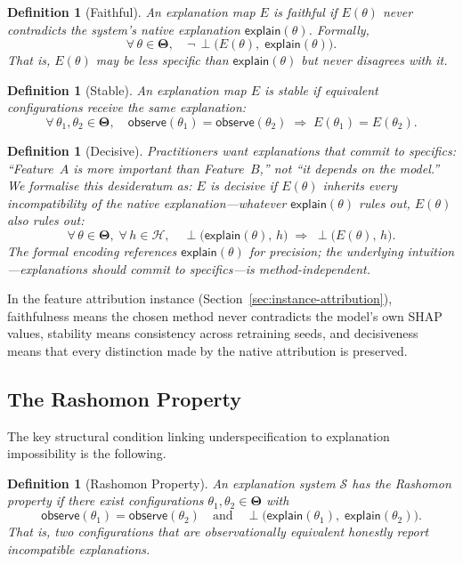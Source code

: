 \documentclass[11pt,a4paper]{article}
\newtheorem{definition}[theorem]{Definition}
\newcommand{\Params}{\mathbf{\Theta}}
\newcommand{\sH}{\mathcal{H}}
\newcommand{\incomp}{\perp}
\begin{document}
\begin{definition}[Faithful]
\label{def:faithful}
An explanation map $E$ is \emph{faithful} if $E(\theta)$ never contradicts the
system's native explanation $\mathsf{explain}(\theta)$.  Formally,
\[
  \forall\,\theta \in \Params,\quad
  \neg\,\incomp\bigl(E(\theta),\;\mathsf{explain}(\theta)\bigr).
\]
That is, $E(\theta)$ may be less specific than $\mathsf{explain}(\theta)$ but
never disagrees with it.
\end{definition}

\begin{definition}[Stable]
\label{def:stable}
An explanation map $E$ is \emph{stable} if equivalent configurations receive
the same explanation:
\[
  \forall\,\theta_1, \theta_2 \in \Params,\quad
  \mathsf{observe}(\theta_1) = \mathsf{observe}(\theta_2)
  \;\Longrightarrow\;
  E(\theta_1) = E(\theta_2).
\]
\end{definition}

\begin{definition}[Decisive]
\label{def:decisive}
Practitioners want explanations that commit to specifics: ``Feature~$A$ is
more important than Feature~$B$,'' not ``it depends on the model.''
We formalise this desideratum as: $E$ is \emph{decisive} if $E(\theta)$
inherits every incompatibility of the native explanation---whatever
$\mathsf{explain}(\theta)$ rules out, $E(\theta)$ also rules out:
\[
  \forall\,\theta \in \Params,\;\forall\,h \in \sH,\quad
  \incomp\bigl(\mathsf{explain}(\theta),\, h\bigr)
  \;\Longrightarrow\;
  \incomp\bigl(E(\theta),\, h\bigr).
\]
The formal encoding references $\mathsf{explain}(\theta)$ for
precision; the underlying intuition---explanations should commit to
specifics---is method-independent.
\end{definition}

In the feature attribution instance (Section~\ref{sec:instance-attribution}),
faithfulness means the chosen method never contradicts the model's own SHAP
values, stability means consistency across retraining seeds, and decisiveness
means that every distinction made by the native attribution is preserved.

\subsection{The Rashomon Property}

The key structural condition linking underspecification to explanation
impossibility is the following.

\begin{definition}[Rashomon Property]
\label{def:rashomon}
An explanation system $\mathcal{S}$ has the \emph{Rashomon property} if there
exist configurations $\theta_1, \theta_2 \in \Params$ with
\[
  \mathsf{observe}(\theta_1) = \mathsf{observe}(\theta_2)
  \quad\text{and}\quad
  \incomp\bigl(\mathsf{explain}(\theta_1),\;\mathsf{explain}(\theta_2)\bigr).
\]
That is, two configurations that are observationally equivalent honestly report
incompatible explanations.
\end{definition}
\end{document}
